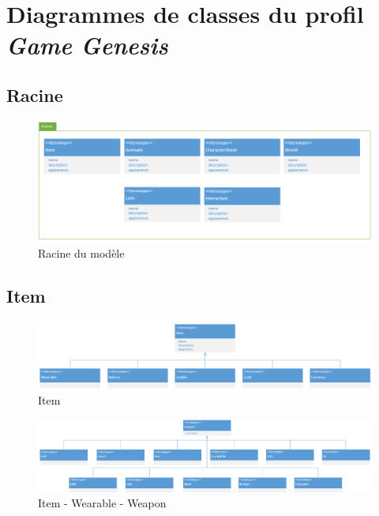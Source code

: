 \appendix
\chapter{Diagrammes de classes du profil \emph{Game Genesis}}

\section{Racine}
\begin{figure}[H]
    \begin{center}
    \includegraphics[width=14cm]{10_img/Z_annexeA/00.PNG} 
    \caption{Racine du modèle}
    \label{A-racine}
    \end{center}
\end{figure}

\newpage
\section{Item}
\begin{figure}
    \begin{center}
    \includegraphics[width=20cm]{10_img/Z_annexeA/item_racine.PNG} 
    \caption{Item}
    \label{A-item-racine}
    \end{center}
\end{figure}

\newpage
\begin{figure}
    \begin{center}
    \includegraphics[width=20cm]{10_img/Z_annexeA/item_wearable_weapon.PNG} 
    \caption{Item - Wearable - Weapon}
    \label{A-Weapon}
    \end{center}
\end{figure}

